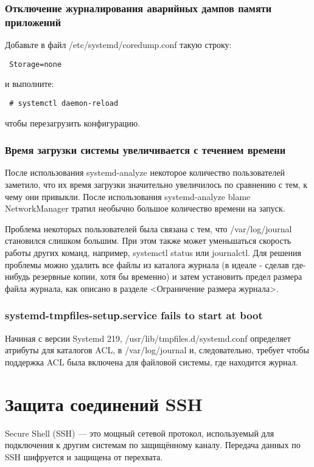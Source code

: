 \documentclass[a4paper,10pt,twoside]{article}
\begin{document}
\subsubsection{Отключение журналирования аварийных дампов памяти приложений}
Добавьте в файл /etc/systemd/coredump.conf такую строку:

\begin{verbatim}
 Storage=none
\end{verbatim} 
и выполните:

\begin{verbatim}
 # systemctl daemon-reload
\end{verbatim}  
чтобы перезагрузить конфигурацию.


\subsubsection{Время загрузки системы увеличивается с течением времени}
После использования systemd-analyze некоторое количество пользователей заметило, что их время загрузки значительно увеличилось по сравнению с тем, к чему они привыкли. После использования systemd-analyze blame NetworkManager тратил необычно большое количество времени на запуск.

Проблема некоторых пользователей была связана с тем, что /var/log/journal становился слишком большим. При этом также может уменьшаться скорость работы других команд, например, systemctl status или journalctl. Для решения проблемы можно удалить все файлы из каталога журнала (в идеале - сделав где-нибудь резервные копии, хотя бы временно) и затем установить предел размера файла журнала, как описано в разделе <Ограничение размера журнала>.

\subsubsection{systemd-tmpfiles-setup.service fails to start at boot}
Начиная с версии Systemd 219, /usr/lib/tmpfiles.d/systemd.conf определяет атрибуты для каталогов ACL, в /var/log/journal и, следовательно, требует чтобы поддержка ACL была включена для файловой системы, где находится журнал.


\section{Защита соединений SSH}

Secure Shell (SSH) — это мощный сетевой протокол, используемый для подключения к другим системам по защищённому каналу. Передача данных по SSH шифруется и защищена от перехвата. 
\end{document}
